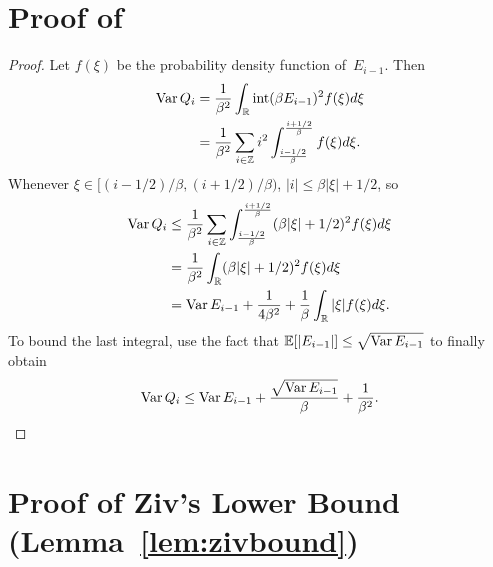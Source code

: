 \begin{subappendices}
\section{Proof of }\label{app:qvarboundproof}

\begin{proof}
  Let $f(\xi)$ be the probability density function of~$E_{i-1}$. Then
  \begin{align*}
    \operatorname{Var} Q_i &= \frac{1}{\beta^2} \int_{\mathbb{R}} \operatorname{int}(\beta E_{i-1})^2 f(\xi) d\xi \\
    &= \frac{1}{\beta^2} \sum_{i\in\mathbb{Z}} i^2
    \int_{\frac{i-1/2}{\beta}}^{\frac{i+1/2}{\beta}} f(\xi) d\xi.
  \end{align*}
  Whenever $\xi \in [(i-1/2)/\beta, (i+1/2)/\beta)$, $|i| \le \beta|\xi| + 1/2$,
  so
  \begin{align*}
    \operatorname{Var} Q_i &\le \frac{1}{\beta^2} \sum_{i\in \mathbb{Z}}
    \int_{\frac{i-1/2}{\beta}}^{\frac{i+1/2}{\beta}} (\beta|\xi| + 1/2)^2 
    f(\xi) d\xi \\
    &= \frac{1}{\beta^2} \int_{\mathbb{R}} (\beta|\xi| + 1/2)^2 f(\xi) d\xi \\
    &= \operatorname{Var} E_{i-1} + \frac{1}{4\beta^2} + \frac{1}{\beta} \int_{\mathbb{R}} |\xi|
    f(\xi)d\xi.
  \end{align*}
  To bound the last integral, use the fact that $\mathbb{E}[|E_{i-1}|] \le \sqrt{\operatorname{Var}
  E_{i-1}}$ to finally obtain
  \begin{equation*}
    \operatorname{Var} Q_i \le \operatorname{Var} E_{i-1} + \frac{\sqrt{\operatorname{Var} E_{i-1}}}{\beta} +
    \frac{1}{\beta^2}.
  \end{equation*}
\end{proof}
  

  \section{Proof of Ziv's Lower Bound (Lemma~\ref{lem:zivbound})}
  \label{app:zivboundproof}


\end{subappendices}
